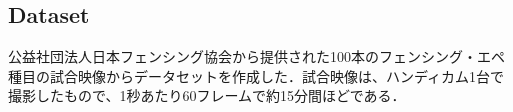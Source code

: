 \subsection{Dataset}
公益社団法人日本フェンシング協会から提供された100本のフェンシング・エペ種目の試合映像からデータセットを作成した．試合映像は、ハンディカム1台で撮影したもので、1秒あたり60フレームで約15分間ほどである．
